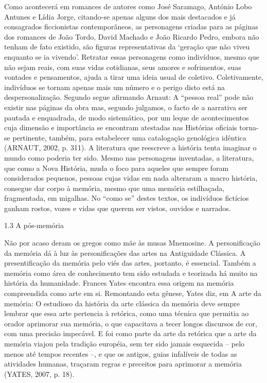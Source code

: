 \documentclass[../DISSERTACAO_MAIN.tex]{subfiles}
\begin{document}
Como acontecerá em romances de autores como José Saramago, António Lobo Antunes e Lídia Jorge, citando-se apenas alguns dos mais destacados e já consagrados ficcionistas contemporâneos, as personagens criadas para as páginas dos romances de João Tordo, David Machado e João Ricardo Pedro, embora não tenham de fato existido, são figuras representativas da ‘geração que não viveu enquanto se ia vivendo’. Retratar essas personagens como indivíduos, mesmo que não sejam reais, com suas vidas cotidianas, seus amores e sofrimentos, suas vontades e pensamentos, ajuda a tirar uma ideia usual de coletivo. Coletivamente, indivíduos se tornam apenas mais um número e o perigo disto está na despersonalização. Segundo segue afirmando Arnaut:
A “pessoa real” pode não existir nas páginas da obra mas, segundo julgamos, o facto de a narrativa ser pautada e enquadrada, de modo sistemático, por um leque de acontecimentos cuja dimensão e importância se encontram atestadas nas Histórias oficiais torna-se pertinente, também, para estabelecer uma catalogação genológica idêntica (ARNAUT, 2002, p. 311).
A literatura que reescreve a história tenta imaginar o mundo como poderia ter sido. Mesmo nas personagens inventadas, a literatura, que como a Nova História, muda o foco para aqueles que sempre foram considerados pequenos, pessoas cujas vidas em nada alteraram a macro história, consegue dar corpo à memória, mesmo que uma memória estilhaçada, fragmentada, em migalhas. No “como se” destes textos, os indivíduos fictícios ganham rostos, vozes e vidas que querem ser vistos, ouvidos e narrados.

1.3 A pós-memória


Não por acaso deram os gregos como mãe às musas Mnemosine. A personificação da memória dá à luz às personificações das artes na Antiguidade Clássica. A presentificação da memória pelo viés das artes, portanto, é essencial. Também a memória como área de conhecimento tem sido estudada e teorizada há muito na história da humanidade. Frances Yates encontra essa origem na memória compreendida como arte em si. Remontando esta gênese, Yates diz, em A arte da memória:
O estudioso da história da arte clássica da memória deve sempre lembrar que essa arte pertencia à retórica, como uma técnica que permitia ao orador aprimorar sua memória, o que capacitava a tecer longos discursos de cor, com uma precisão impecável. E foi como parte da arte da retórica que a arte da memória viajou pela tradição européia, sem ter sido jamais esquecida – pelo menos até tempos recentes –,  e que os antigos, guias infalíveis de todas as atividades humanas, traçaram regras e preceitos para aprimorar a memória (YATES, 2007, p. 18).
\end{document}
